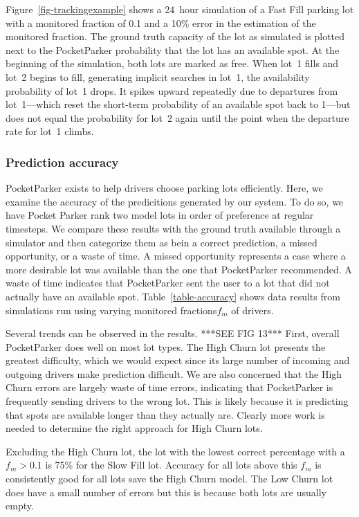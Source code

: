 Figure~\ref{fig-trackingexample} shows a 24~hour simulation of a Fast Fill
parking lot with a monitored fraction of 0.1 and a 10\% error in the
estimation of the monitored fraction. The ground truth capacity of the lot as
simulated is plotted next to the PocketParker probability that the lot has an
available spot. At the beginning of the simulation, both lots are marked as
free. When lot~1 fills and lot~2 begins to fill, generating implicit searches
in lot~1, the availability probability of lot~1 drops. It spikes upward
repeatedly due to departures from lot~1---which reset the short-term
probability of an available spot back to 1---but does not equal the
probability for lot~2 again until the point when the departure rate for lot~1
climbs.

\subsubsection{Prediction accuracy}



PocketParker exists to help drivers choose parking lots efficiently.  Here,
we examine the accuracy of the predicitions generated by our system.  To do
so, we have Pocket Parker rank two model lots in order of preference at
regular timesteps.  We compare these results with the ground truth available
through a simulator and then categorize them as bein a correct prediction,
a missed opportunity, or a waste of time. A missed opportunity represents a
case where a more desirable lot was available than the one that PocketParker
recommended. A waste of time indicates that PocketParker sent the user to a
lot that did not actually have an available spot.  Table~\ref{table-accuracy}
shows data results from simulations run using varying monitored
fractions$f_m$ of drivers.

Several trends can be observed in the results.  
			***SEE FIG 13*** 
First, overall PocketParker
does well on most lot types. The High Churn lot presents the greatest
difficulty, which we would expect since its large number of incoming and
outgoing drivers make prediction difficult. We are also concerned that the
High Churn errors are largely waste of time errors, indicating that
PocketParker is frequently sending drivers to the wrong lot.  This is likely
because it is predicting that spots are available longer than they actually
are. Clearly more work is needed to determine the right approach for High
Churn lots.

Excluding the High Churn lot, the lot with the lowest correct percentage with
a $f_m > 0.1$ is 75\% for the Slow Fill lot.  Accuracy for all lots above
this $f_m$ is consistently good for all lots save the High Churn model.  The
Low Churn lot does have a small number of errors but this is because both lots
are usually empty.

